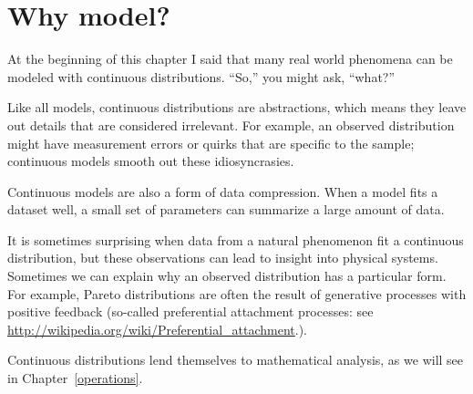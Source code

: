 \documentclass[12pt]{book}
\begin{document}
\section{Why model?}

At the beginning of this chapter I said that many real world phenomena
can be modeled with continuous distributions.  ``So,'' you might ask,
``what?''

Like all models, continuous distributions are abstractions, which
means they leave out details that are considered irrelevant.
For example, an observed distribution might have measurement errors
or quirks that are specific to the sample; continuous models smooth
out these idiosyncrasies.

Continuous models are also a form of data compression.  When a model
fits a dataset well, a small set of parameters can summarize a
large amount of data.

It is sometimes surprising when data from a natural phenomenon fit a
continuous distribution, but these observations can lead to insight
into physical systems.  Sometimes we can explain why an observed
distribution has a particular form.  For example, Pareto distributions
are often the result of generative processes with positive feedback
(so-called preferential attachment processes: see
\url{http://wikipedia.org/wiki/Preferential_attachment}.).

Continuous distributions lend themselves to mathematical analysis, as
we will see in Chapter~\ref{operations}.
\end{document}

